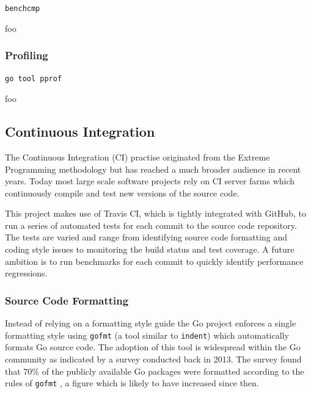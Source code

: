 \documentclass[12pt, a4paper]{article}
\begin{document}
\texttt{benchcmp}

foo

\subsubsection{Profiling}



\texttt{go tool pprof}

foo


\subsection{Continuous Integration}

The Continuous Integration (CI) practise originated from the Extreme Programming methodology \cite{xp} but has reached a much broader audience in recent years. Today most large scale software projects rely on CI server farms which continuously compile and test new versions of the source code.

This project makes use of Travis CI, which is tightly integrated with GitHub, to run a series of automated tests for each commit to the source code repository. The tests are varied and range from identifying source code formatting and coding style issues to monitoring the build status and test coverage. A future ambition is to run benchmarks for each commit to quickly identify performance regressions.

\subsubsection{Source Code Formatting}

Instead of relying on a formatting style guide the Go project enforces a single formatting style using \texttt{gofmt} (a tool similar to \texttt{indent}) which automatically formats Go source code. The adoption of this tool is widespread within the Go community as indicated by a survey conducted back in 2013. The survey found that 70\% of the publicly available Go packages were formatted according to the rules of \texttt{gofmt} \cite{gofmt_70percent}, a figure which is likely to have increased since then.
\end{document}
